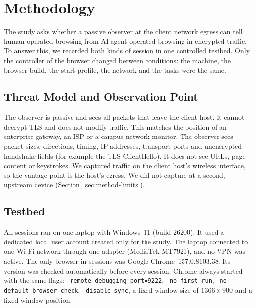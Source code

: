 \section{Methodology}
\label{sec:method}

The study asks whether a passive observer at the client network egress can tell human-operated browsing from AI-agent-operated browsing in encrypted traffic. To answer this, we recorded both kinds of session in one controlled testbed. Only the controller of the browser changed between conditions: the machine, the browser build, the start profile, the network and the tasks were the same.

\subsection{Threat Model and Observation Point}
\label{sec:method-threat}
The observer is passive and sees all packets that leave the client host. It cannot decrypt TLS and does not modify traffic. This matches the position of an enterprise gateway, an ISP or a campus network monitor. The observer sees packet sizes, directions, timing, IP addresses, transport ports and unencrypted handshake fields (for example the TLS ClientHello). It does not see URLs, page content or keystrokes. We captured traffic on the client host's wireless interface, so the vantage point is the host's egress. We did not capture at a second, upstream device (Section~\ref{sec:method-limits}).

\subsection{Testbed}
\label{sec:method-testbed}
All sessions ran on one laptop with Windows~11 (build 26200). It used a dedicated local user account created only for the study. The laptop connected to one Wi-Fi network through one adapter (MediaTek MT7921), and no VPN was active. The only browser in sessions was Google Chrome~157.0.8103.38. Its version was checked automatically before every session. Chrome always started with the same flags: \texttt{--remote-debugging-port=9222}, \texttt{--no-first-run}, \texttt{--no-default-browser-check}, \texttt{--disable-sync}, a fixed window size of $1366\times900$ and a fixed window position.

